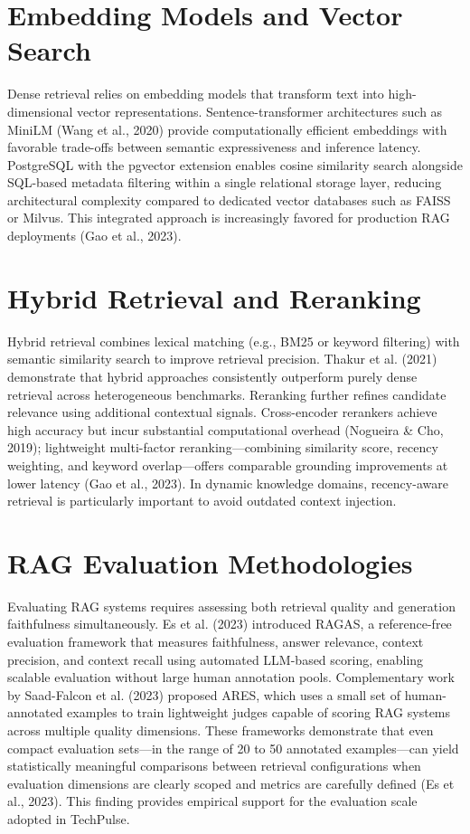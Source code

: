 \documentclass[12pt,a4paper]{report}
\begin{document}
\section{Embedding Models and Vector Search}
\label{sec:lit_embed}

Dense retrieval relies on embedding models that transform text into high-dimensional vector representations. Sentence-transformer architectures such as MiniLM (Wang et al., 2020) provide computationally efficient embeddings with favorable trade-offs between semantic expressiveness and inference latency. PostgreSQL with the pgvector extension enables cosine similarity search alongside SQL-based metadata filtering within a single relational storage layer, reducing architectural complexity compared to dedicated vector databases such as FAISS or Milvus. This integrated approach is increasingly favored for production RAG deployments (Gao et al., 2023).

\section{Hybrid Retrieval and Reranking}
\label{sec:lit_hybrid}

Hybrid retrieval combines lexical matching (e.g., BM25 or keyword filtering) with semantic similarity search to improve retrieval precision. Thakur et al. (2021) demonstrate that hybrid approaches consistently outperform purely dense retrieval across heterogeneous benchmarks. Reranking further refines candidate relevance using additional contextual signals. Cross-encoder rerankers achieve high accuracy but incur substantial computational overhead (Nogueira \& Cho, 2019); lightweight multi-factor reranking---combining similarity score, recency weighting, and keyword overlap---offers comparable grounding improvements at lower latency (Gao et al., 2023). In dynamic knowledge domains, recency-aware retrieval is particularly important to avoid outdated context injection.

\section{RAG Evaluation Methodologies}
\label{sec:lit_eval}

Evaluating RAG systems requires assessing both retrieval quality and generation faithfulness simultaneously. Es et al. (2023) introduced RAGAS, a reference-free evaluation framework that measures faithfulness, answer relevance, context precision, and context recall using automated LLM-based scoring, enabling scalable evaluation without large human annotation pools. Complementary work by Saad-Falcon et al. (2023) proposed ARES, which uses a small set of human-annotated examples to train lightweight judges capable of scoring RAG systems across multiple quality dimensions. These frameworks demonstrate that even compact evaluation sets---in the range of 20 to 50 annotated examples---can yield statistically meaningful comparisons between retrieval configurations when evaluation dimensions are clearly scoped and metrics are carefully defined (Es et al., 2023). This finding provides empirical support for the evaluation scale adopted in TechPulse.
\end{document}
